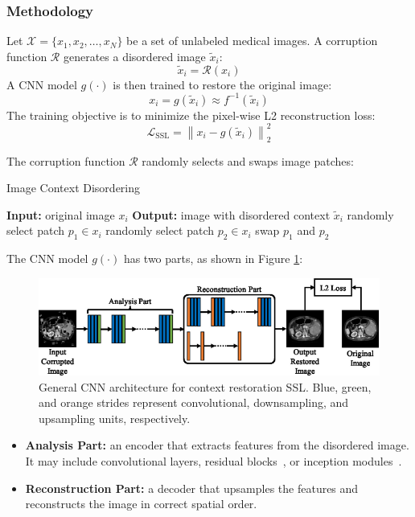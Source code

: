\documentclass{article}
\begin{document}
\subsubsection{Methodology}
Let $\mathcal{X} = \{x_1, x_2, \ldots, x_N\}$ be a set of unlabeled medical images. A corruption function $\mathcal{R}$ generates a disordered image $\tilde{x}_i$:
\[
\tilde{x}_i = \mathcal{R}(x_i)
\]
A CNN model $g(\cdot)$ is then trained to restore the original image:
\[
x_i = g(\tilde{x}_i) \approx f^{-1}(\tilde{x}_i)
\]
The training objective is to minimize the pixel-wise L2 reconstruction loss:
\[
\mathcal{L}_{\text{SSL}} = \left\| x_i - g(\tilde{x}_i) \right\|_2^2
\]

The corruption function $\mathcal{R}$ randomly selects and swaps image patches:

\begin{algorithm}[H]
    \caption{Image Context Disordering}
    \begin{algorithmic}[1]
    \STATE \textbf{Input:} original image $x_i$
    \STATE \textbf{Output:} image with disordered context $\tilde{x}_i$
      \STATE randomly select patch $p_1 \in x_i$
      \STATE randomly select patch $p_2 \in x_i$
        \STATE swap $p_1$ and $p_2$
      \ENDIF
    \ENDFOR
    \end{algorithmic}
\end{algorithm}


The CNN model $g(\cdot)$ has two parts, as shown in Figure \ref{fig:context_restoration_architecture}:

\begin{figure}[htb]
    \centering
    \includegraphics[width=0.98\linewidth]{images/General_CNN_architecture_for_the_context_restoration_self_supervised_learning.pdf}
    \caption{General CNN architecture for context restoration SSL. Blue, green, and orange strides represent convolutional, downsampling, and upsampling units, respectively.}
    \label{fig:context_restoration_architecture}
\end{figure}

\begin{itemize}
    \item \textbf{Analysis Part:} an encoder that extracts features from the disordered image. It may include convolutional layers, residual blocks~\cite{He2015DeepRL}, or inception modules~\cite{Szegedy2015RethinkingTI}.
    \item \textbf{Reconstruction Part:} a decoder that upsamples the features and reconstructs the image in correct spatial order.
\end{itemize}
\end{document}
